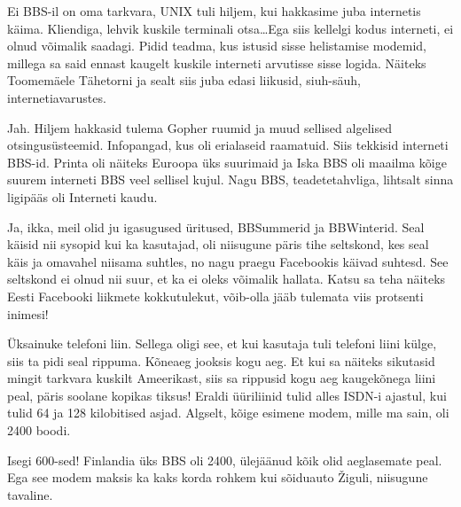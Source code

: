
Ei BBS-il on oma tarkvara, UNIX tuli hiljem, kui hakkasime juba internetis käima. Kliendiga, lehvik kuskile terminali otsa\ldots Ega siis kellelgi kodus interneti, ei olnud võimalik saadagi. Pidid teadma, kus istusid  sisse helistamise modemid, millega sa said ennast kaugelt kuskile interneti arvutisse sisse logida. Näiteks Toomemäele Tähetorni ja sealt siis juba edasi liikusid, siuh-säuh, internetiavarustes.
                 
                 
Jah. Hiljem hakkasid tulema Gopher ruumid ja muud sellised algelised otsingusüsteemid. Infopangad, kus oli erialaseid raamatuid. Siis tekkisid interneti BBS-id. Printa oli näiteks Euroopa üks suurimaid ja Iska BBS oli maailma kõige suurem interneti BBS veel sellisel kujul. Nagu BBS, teadetetahvliga, lihtsalt sinna ligipääs oli Interneti kaudu.


Ja, ikka, meil olid ju igasugused üritused, BBSummerid ja BBWinterid. Seal käisid nii sysopid kui ka  kasutajad, oli niisugune päris tihe seltskond, kes seal käis ja omavahel niisama suhtles, no nagu praegu Facebookis käivad suhtesd.  See seltskond ei olnud nii suur, et ka  ei oleks võimalik hallata. Katsu sa teha näiteks Eesti Facebooki liikmete kokkutulekut, võib-olla  jääb tulemata  viis protsenti inimesi!
        

Üksainuke telefoni liin. Sellega oligi see, et kui kasutaja tuli telefoni liini külge, siis ta pidi seal rippuma. Kõneaeg jooksis kogu aeg. Et kui sa näiteks sikutasid mingit tarkvara kuskilt Ameerikast, siis sa rippusid kogu aeg kaugekõnega liini peal, päris soolane kopikas tiksus! Eraldi üüriliinid tulid alles ISDN-i ajastul, kui tulid 64 ja 128 kilobitised asjad. Algselt, kõige esimene modem, mille ma sain, oli 2400 boodi.
                 

Isegi 600-sed! Finlandia üks BBS oli 2400,  ülejäänud kõik olid aeglasemate peal. Ega see modem maksis ka kaks korda rohkem kui sõiduauto Žiguli, niisugune tavaline.

